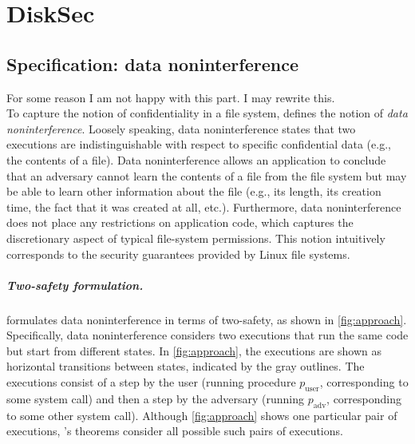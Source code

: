 \chapter{DiskSec}


\section{Specification: data noninterference}
\label{s:spec}

{\color{red} For some reason I am not happy with this part. I may rewrite this. }\\
To capture the notion of confidentiality in a file system, \sys
defines the notion of \emph{data noninterference}.  Loosely speaking,
data noninterference states that two executions are indistinguishable
with respect to specific confidential data (e.g., the contents of
a file).  Data noninterference allows an application to conclude that
an adversary cannot learn the contents of a file from the file system
but may be able to learn other information about the file (e.g., its
length, its creation time, the fact that it was created at all, etc.).
Furthermore, data noninterference does not place any restrictions on
application code, which captures the discretionary aspect of typical
file-system permissions.  This notion intuitively corresponds to the
security guarantees provided by Linux file systems.

%    

\paragraph{Two-safety formulation.}
\sys formulates data noninterference in terms of two-safety, as shown
in \autoref{fig:approach}.  Specifically, data noninterference considers
two executions that run the same code but start from different states.  In
\autoref{fig:approach}, the executions are shown as horizontal transitions
between states, indicated by the gray outlines.  The executions
consist of a step by the user (running procedure $p_\mathrm{user}$,
corresponding to some system call) and then a step by the adversary
(running $p_\mathrm{adv}$, corresponding to some other system call).
Although \autoref{fig:approach} shows one particular pair of executions,
\sys's theorems consider all possible such pairs of executions.

